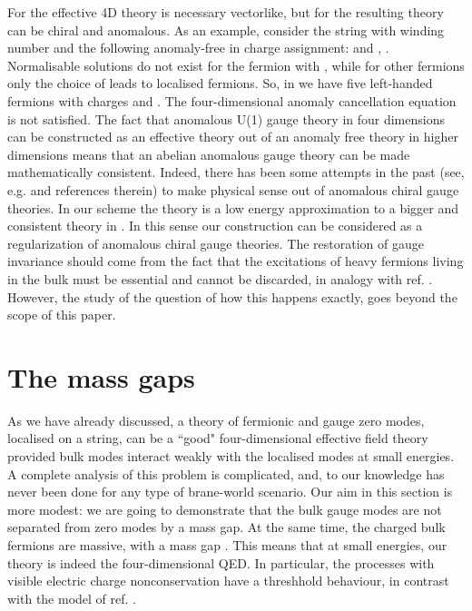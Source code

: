 \documentclass[a4paper,12pt]{article}
\begin{document}
For \coordHE{} the effective 4D theory is necessary vectorlike, but
for \coordHE{} the resulting theory can be chiral and anomalous. As
an example, consider the string with winding number \coordHE{} and the
following  anomaly-free in \coordHE{} charge assignment:
\coordHE{} and  \coordHE{}, \coordHE{}. Normalisable solutions do not exist for the
\coordHE{} fermion with \coordHE{}, while for other fermions only the
choice of  \coordHE{} leads to localised \coordHE{} fermions. So, in
\coordHE{} we have five left-handed fermions with charges
\coordHE{} and
\coordHE{}. The four-dimensional anomaly cancellation
equation \coordHE{} is not satisfied. The fact that anomalous
U(1) gauge theory in four dimensions can be constructed as an
effective theory out of an anomaly free theory in higher dimensions
means that an abelian anomalous gauge theory can be made
mathematically consistent. Indeed, there has been some attempts in
the past (see, e.g. \cite{Faddeev:pc} and references therein) to make
physical sense out of anomalous chiral gauge theories.  In our scheme
the \coordHE{} theory is a low energy approximation to a bigger and
consistent theory in \coordHE{}. In this sense our construction can be
considered as a regularization of \coordHE{} anomalous chiral gauge
theories. The restoration of \coordHE{} gauge invariance should come from
the fact that the  excitations of heavy fermions living in the bulk
must be essential and cannot be discarded, in analogy with ref.
\cite{D'Hoker:1984pc}. However, the study of the question of how this
happens exactly, goes beyond the scope of this paper. 

\section{The mass gaps} 

As we have already discussed, a theory of fermionic and gauge zero
modes, localised on a string, can be a ``good" four-dimensional
effective field theory provided bulk modes interact weakly with the
localised modes at small energies. A complete analysis of this
problem is complicated, and, to our  knowledge has never been
done for any type of brane-world scenario. Our aim in this section is
more modest: we are going to demonstrate that the bulk gauge modes
are not separated from zero modes by a mass gap. At the same time,
the charged bulk fermions are massive, with a mass gap \coordHE{}. This means that at small energies, \coordHE{}
our theory is indeed the four-dimensional QED. In particular, the
processes with visible electric charge nonconservation have a
threshhold behaviour, in  contrast with the model of ref.
\cite{Dubovsky:2000av}.
\end{document}
